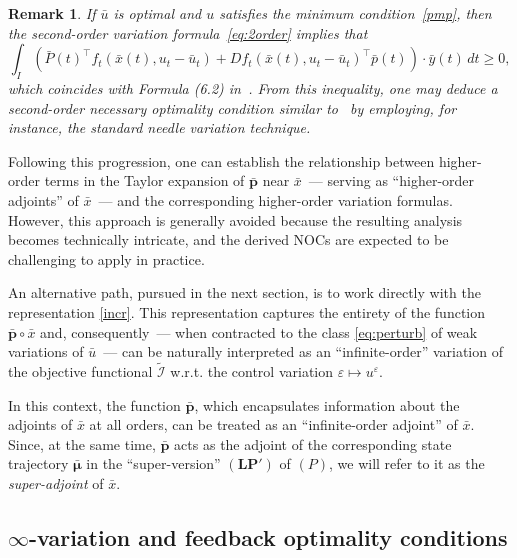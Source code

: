 \documentclass[sn-mathphys-num]{sn-jnl}
\numberwithin{equation}{section}
\theoremstyle{mythm}
\theoremstyle{mydef}
\newtheorem{remark}[proposition]{Remark}
\renewcommand{\epsilon}{\varepsilon}
\newcommand{\T}{\intercal}
\begin{document}
\begin{remark}
  If \( \bar{u} \) is optimal and \( u \) satisfies the minimum condition~\eqref{pmp}, then the second-order variation formula~\eqref{eq:2order} implies that 
\[
\int_I \left( \bar{P}(t)^{\T} f_t\left( \bar{x}(t), u_t - \bar{u}_t \right) + Df_t\left( \bar{x}(t), u_t - \bar{u}_t \right)^{\T} \bar{p}(t) \right) \cdot \bar{y}(t) \, dt \geq 0,
\]
which coincides with Formula (6.2) in~\cite{frankowskaPointwiseSecondorderNecessary2017}. From this inequality, one may deduce a second-order necessary optimality condition similar to~\cite[Theorem~3.1]{frankowskaPointwiseSecondorderNecessary2017} by employing, for instance, the standard needle variation technique.

\end{remark}


Following this progression, one can establish the relationship between higher-order terms in the Taylor expansion of $\bar{\bm{p}}$ near $\bar{x}$~--- serving as ``higher-order adjoints'' of $\bar{x}$~--- and the corresponding higher-order variation formulas. However, this approach is generally avoided because the resulting analysis becomes technically intricate, and the derived NOCs are expected to be challenging to apply in practice.

An alternative path, pursued in the next section, is to work directly with the representation \eqref{incr}. This representation captures the entirety of the function \( \bar{\bm{p}} \circ \bar{x} \) and, consequently~--- when contracted to the class \eqref{eq:perturb} of weak variations of \( \bar{u} \)~--- can be naturally interpreted as an ``infinite-order'' variation of the objective functional \( \widetilde{\mathcal{I}} \) w.r.t. the control variation \( \epsilon \mapsto u^\varepsilon \).

In this context, the function \( \bar{\bm{p}} \), which encapsulates information about the adjoints of \( \bar{x} \) at all orders, can be treated as an ``infinite-order adjoint'' of \( \bar{x} \). Since, at the same time, \( \bar{\bm{p}} \) acts as the adjoint of the corresponding state trajectory \( \bar{\bm{\mu}} \) in the ``super-version'' \( (\bm{LP}') \) of \( (P) \), we will refer to it as the \emph{super-adjoint} of \( \bar{x} \).




\subsection{$\infty$-variation and feedback optimality conditions}\label{ssec:cfbl}
\end{document}
